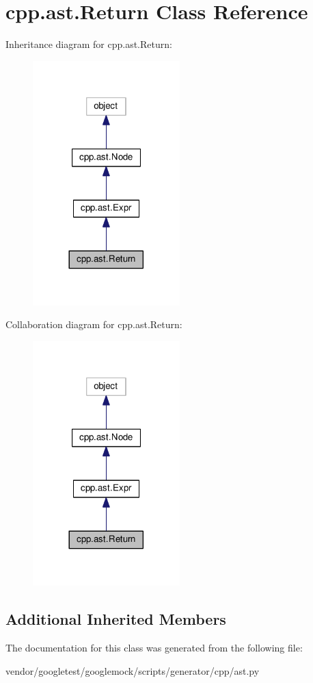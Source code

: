 \hypertarget{classcpp_1_1ast_1_1Return}{}\section{cpp.\+ast.\+Return Class Reference}
\label{classcpp_1_1ast_1_1Return}


Inheritance diagram for cpp.\+ast.\+Return\+:\nopagebreak
\begin{figure}[H]
\begin{center}
\leavevmode
\includegraphics[width=161pt]{classcpp_1_1ast_1_1Return__inherit__graph}
\end{center}
\end{figure}


Collaboration diagram for cpp.\+ast.\+Return\+:\nopagebreak
\begin{figure}[H]
\begin{center}
\leavevmode
\includegraphics[width=161pt]{classcpp_1_1ast_1_1Return__coll__graph}
\end{center}
\end{figure}
\subsection*{Additional Inherited Members}


The documentation for this class was generated from the following file\+:\begin{DoxyCompactItemize}
\item 
vendor/googletest/googlemock/scripts/generator/cpp/ast.\+py\end{DoxyCompactItemize}
